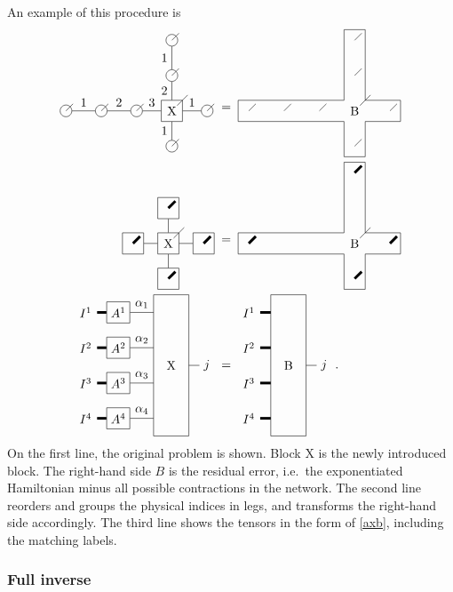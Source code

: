 \def \blockct { \begin{tikzpicture}[baseline=3]
        \draw (0,2.5)-- (0,-1.5) -- (1,-1.5)-- (1,2.5) -- cycle;

        \node[draw=none] (x)  at (0.5,0.5) {B};

        \draw[line width=0.75mm] (-0.3,2)  node [left] {$I^1$}  -- (0,2) ;
        \draw[line width=0.75mm] (-0.3,1)  node [left] {$I^2$} -- (0,1);
        \draw[line width=0.75mm] (-0.3,0)  node [left] {$I^3$} -- (0,0);
        \draw[line width=0.75mm] (-0.3,-1)  node [left] {$I^4$} -- (0,-1);

        \draw (1,0.5) -- (1.3,0.5)  node [right] {$j$} ;

    \end{tikzpicture} }

\noindent
An example of this procedure is
\begin{align}
    \pepoat                 \; & =  \;\blockat                                     \\
    \pepobt                 \; & =  \;\blockbt                                     \\
    \vcenter{\hbox{ \pepoct }} & =\vcenter{\hbox{  \blockct }} . \label{extract_x}
\end{align}
On the first line, the original problem is shown. Block X is the newly introduced block. The right-hand side $B$ is the residual error, i.e.\ the exponentiated Hamiltonian minus all possible contractions in the network. The second line reorders and groups the physical indices in legs, and transforms the right-hand side accordingly. The third line shows the tensors in the form of \cref{axb}, including the matching labels.

\subsubsection{Full inverse}

